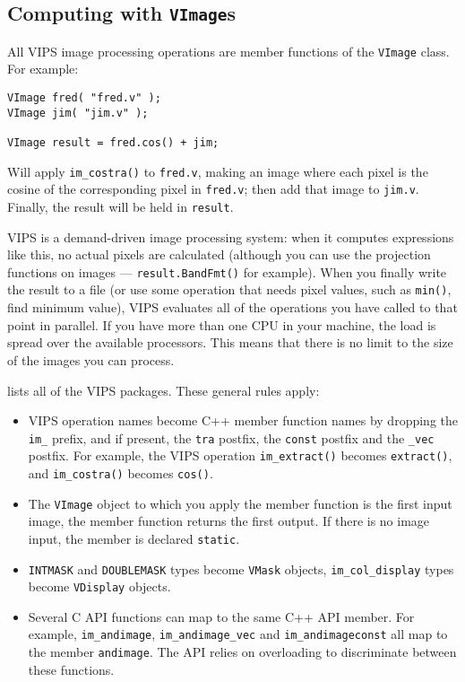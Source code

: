 \subsection{Computing with \texttt{VImage}s}
\label{sec:compute}

All VIPS image processing operations are member functions of the \verb+VImage+
class. For example:

\begin{verbatim}
VImage fred( "fred.v" );
VImage jim( "jim.v" );

VImage result = fred.cos() + jim;
\end{verbatim}

Will apply \verb+im_costra()+ to \verb+fred.v+, making an image where each
pixel is the cosine of the corresponding pixel in \verb+fred.v+; then add that
image to \verb+jim.v+. Finally, the result will be held in \verb+result+.

VIPS is a demand-driven image processing system: when it computes expressions
like this, no actual pixels are calculated (although you can use the
projection functions on images --- \verb+result.BandFmt()+ for example).  When
you finally write the result to a file (or use some operation that needs pixel
values, such as \verb+min()+, find minimum value), VIPS evaluates all of the
operations you have called to that point in parallel. If you have more than one
CPU in your machine, the load is spread over the available processors. This
means that there is no limit to the size of the images you can process.

 lists all of the VIPS packages. These general
rules apply:

\begin{itemize}

\item
VIPS operation names become C++ member function names by dropping the
\verb+im_+ prefix, and if present, the \verb+tra+ postfix, the \verb+const+
postfix and the \verb+_vec+ postfix. For example, the
VIPS operation \verb+im_extract()+ becomes \verb+extract()+, and
\verb+im_costra()+ becomes \verb+cos()+.

\item
The \verb+VImage+ object to which you apply the member function is the first
input image, the member function returns the first output. If there is no
image input, the member is declared \verb+static+.

\item
\verb+INTMASK+ and \verb+DOUBLEMASK+ types become \verb+VMask+ objects,
\verb+im_col_display+ types become \verb+VDisplay+ objects.

\item
Several C API functions can map to the same C++ API member. For example,
\verb+im_andimage+, \verb+im_andimage_vec+ and \verb+im_andimageconst+ all map
to the member \verb+andimage+. The API relies on overloading to
discriminate between these functions.

\end{itemize}

